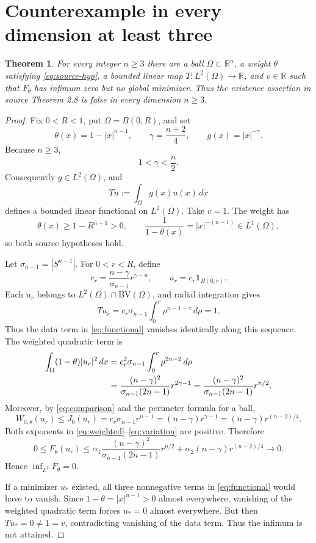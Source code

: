 \documentclass[11pt]{article}
\newtheorem{theorem}{Theorem}
\newcommand{\R}{\mathbb R}
\newcommand{\BV}{\mathrm{BV}}
\newcommand{\TV}{J_0}
\newcommand{\W}{W_{0,\theta}}
\newcommand{\F}{F_\theta}
\begin{document}
\section{Counterexample in every dimension at least three}

\begin{theorem}\label{thm:counterexample}
For every integer \(n\ge3\) there are a ball \(\Omega\subset\R^n\), a
weight \(\theta\) satisfying \eqref{eq:source-hyp}, a bounded linear map
\(T:L^2(\Omega)\to\R\), and \(v\in\R\) such that \(\F\) has infimum zero
but no global minimizer.  Thus the existence assertion in source Theorem
2.8 is false in every dimension \(n\ge3\).
\end{theorem}

\begin{proof}
Fix \(0<R<1\), put \(\Omega=B(0,R)\), and set
\[
 \theta(x)=1-|x|^{n-1},
 \qquad
 \gamma=\frac{n+2}{4},
 \qquad
 g(x)=|x|^{-\gamma}.
\]
Because \(n\ge3\),
\[
 1<\gamma<\frac n2.
\]
Consequently \(g\in L^2(\Omega)\), and
\[
 Tu:=\int_\Omega g(x)u(x)\,dx
\]
defines a bounded linear functional on \(L^2(\Omega)\).  Take \(v=1\).
The weight has
\[
 \theta(x)\ge1-R^{n-1}>0,
 \qquad
 \frac1{1-\theta(x)}=|x|^{-(n-1)}\in L^1(\Omega),
\]
so both source hypotheses hold.

Let \(\sigma_{n-1}=|S^{n-1}|\).  For \(0<r<R\), define
\[
 c_r=\frac{n-\gamma}{\sigma_{n-1}}r^{\gamma-n},
 \qquad
 u_r=c_r\mathbf1_{B(0,r)}.
\]
Each \(u_r\) belongs to \(L^2(\Omega)\cap\BV(\Omega)\), and radial
integration gives
\begin{equation}\label{eq:datafit}
 Tu_r=c_r\sigma_{n-1}\int_0^r\rho^{n-1-\gamma}\,d\rho=1.
\end{equation}
Thus the data term in \eqref{eq:functional} vanishes identically along this
sequence.  The weighted quadratic term is
\begin{align}
 \int_\Omega(1-\theta)|u_r|^2\,dx
 &=c_r^2\sigma_{n-1}\int_0^r\rho^{2n-2}\,d\rho\notag\\
 &=\frac{(n-\gamma)^2}{\sigma_{n-1}(2n-1)}
   r^{2\gamma-1}
 =\frac{(n-\gamma)^2}{\sigma_{n-1}(2n-1)}r^{n/2}.
 \label{eq:weighted}
\end{align}
Moreover, by \eqref{eq:comparison} and the perimeter formula for a ball,
\begin{equation}\label{eq:variation}
 \W(u_r)\le\TV(u_r)
 =c_r\sigma_{n-1}r^{n-1}
 =(n-\gamma)r^{\gamma-1}
 =(n-\gamma)r^{(n-2)/4}.
\end{equation}
Both exponents in \eqref{eq:weighted}--\eqref{eq:variation} are positive.
Therefore
\[
 0\le\F(u_r)
 \le \alpha_1\frac{(n-\gamma)^2}{\sigma_{n-1}(2n-1)}r^{n/2}
 +\alpha_2(n-\gamma)r^{(n-2)/4}
 \longrightarrow0.
\]
Hence \(\inf_{L^2}\F=0\).

If a minimizer \(u_*\) existed, all three nonnegative terms in
\eqref{eq:functional} would have to vanish.  Since
\(1-\theta=|x|^{n-1}>0\) almost everywhere, vanishing of the weighted
quadratic term forces \(u_*=0\) almost everywhere.  But then
\(Tu_*=0\ne1=v\), contradicting vanishing of the data term.  Thus the
infimum is not attained.
\end{proof}
\end{document}
